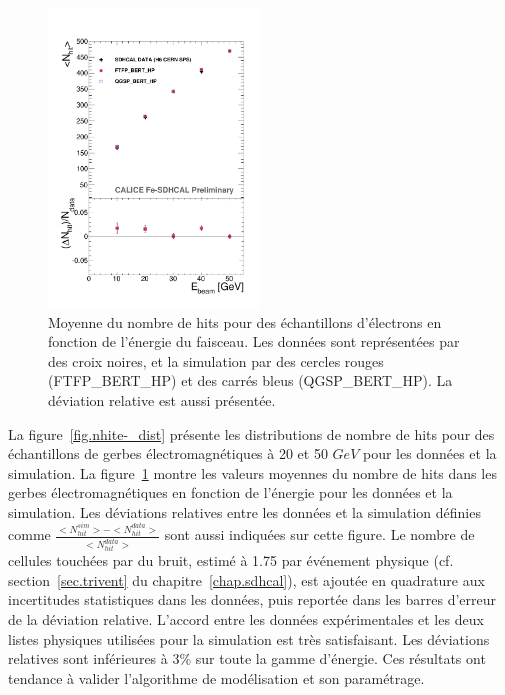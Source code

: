 \begin{figure}[!ht]
  \centering
  \includegraphics[width=0.5\textwidth]{Digitizer/figs/NHITELECTRON.pdf}
  \caption{Moyenne du nombre de hits pour des échantillons d'électrons en fonction de l’énergie du faisceau. Les données sont représentées par des croix noires, et la simulation par des cercles rouges (FTFP\_BERT\_HP) et des carrés bleus (QGSP\_BERT\_HP). La déviation relative est aussi présentée.}
  \label{fig.nhite-}
\end{figure}

La figure~\ref{fig.nhite-_dist} présente les distributions de nombre de hits pour des échantillons de gerbes électromagnétiques à 20 et 50 $GeV$ pour les données et la simulation. 
La figure~\ref{fig.nhite-} montre les valeurs moyennes du nombre de hits dans les gerbes électromagnétiques en fonction de l'énergie pour les données et la simulation. Les déviations relatives entre les données et la simulation définies comme $\frac{<N_{hit}^{sim}>-<N_{hit}^{data}>}{<N_{hit}^{data}>}$ sont aussi indiquées sur cette figure. Le nombre de cellules touchées par du bruit, estimé à 1.75 par événement physique (cf. section~\ref{sec.trivent} du chapitre~\ref{chap.sdhcal}), est ajoutée en quadrature aux incertitudes statistiques dans les données, puis reportée dans les barres d'erreur de la déviation relative. L'accord entre les données expérimentales et les deux listes physiques utilisées pour la simulation est très satisfaisant. Les déviations relatives sont inférieures à 3\% sur toute la gamme d'énergie. Ces résultats ont tendance à valider l'algorithme de modélisation et son paramétrage. 

\newpage
